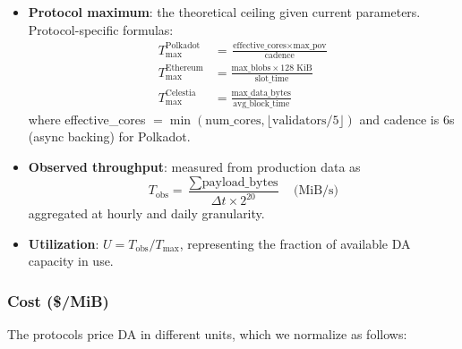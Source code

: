 \begin{itemize}
    \item \textbf{Protocol maximum}: the theoretical ceiling given current parameters.
    Protocol-specific formulas:
    \begin{align}
        T_{\max}^{\text{Polkadot}} &= \frac{\text{effective\_cores} \times \text{max\_pov}}{\text{cadence}} \label{eq:tmax-polkadot} \\
        T_{\max}^{\text{Ethereum}} &= \frac{\text{max\_blobs} \times 128\text{ KiB}}{\text{slot\_time}} \label{eq:tmax-ethereum} \\
        T_{\max}^{\text{Celestia}} &= \frac{\text{max\_data\_bytes}}{\text{avg\_block\_time}} \label{eq:tmax-celestia}
    \end{align}
    where effective\_cores $= \min(\text{num\_cores}, \lfloor\text{validators}/5\rfloor)$ and cadence is 6s (async backing) for Polkadot.

    \item \textbf{Observed throughput}: measured from production data as
    \begin{equation}
        T_{\text{obs}} = \frac{\sum \text{payload\_bytes}}{\Delta t \times 2^{20}} \quad \text{(MiB/s)}
    \end{equation}
    aggregated at hourly and daily granularity.

    \item \textbf{Utilization}: $U = T_{\text{obs}} / T_{\max}$, representing the fraction of available DA capacity in use.
\end{itemize}

\subsubsection{Cost (\$/MiB)}

The protocols price DA in different units, which we normalize as follows:

